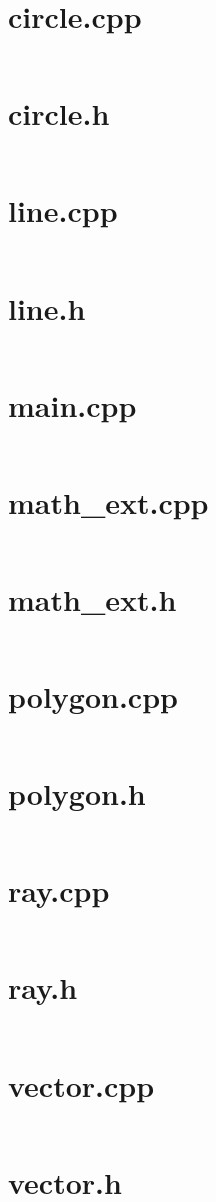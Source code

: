 \chapter{circle.cpp}
\inputminted{c++}{circle.cpp}

\chapter{circle.h}
\inputminted{c++}{circle.h}

\chapter{line.cpp}
\inputminted{c++}{line.cpp}

\chapter{line.h}
\inputminted{c++}{line.h}

\chapter{main.cpp}
\inputminted{c++}{main.cpp}

\chapter{math\_ext.cpp}
\inputminted{c++}{math_ext.cpp}

\chapter{math\_ext.h}
\inputminted{c++}{math_ext.h}

\chapter{polygon.cpp}
\inputminted{c++}{polygon.cpp}

\chapter{polygon.h}
\inputminted{c++}{polygon.h}

\chapter{ray.cpp}
\inputminted{c++}{ray.cpp}

\chapter{ray.h}
\inputminted{c++}{ray.h}

\chapter{vector.cpp}
\inputminted{c++}{vector.cpp}

\chapter{vector.h}
\inputminted{c++}{vector.h}

